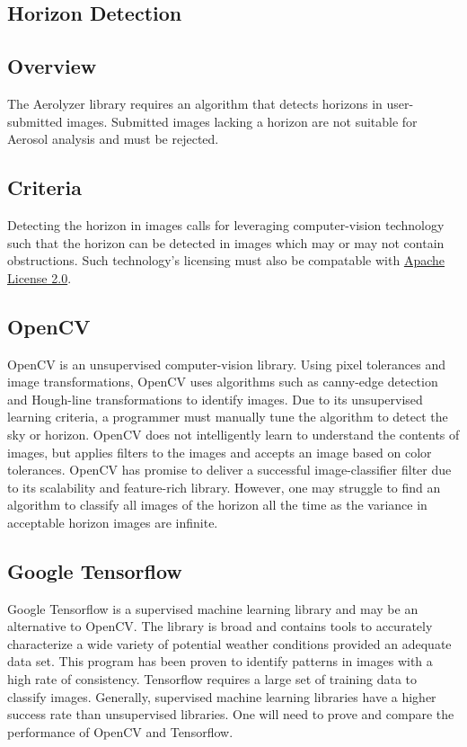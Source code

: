 \documentclass[journal,10pt,draftclsnofoot,onecolumn]{IEEEtran}
\begin{document}
\begin{singlespace}

\section{Horizon Detection}
	\subsection{Overview}
	The Aerolyzer library requires an algorithm that detects horizons in user-submitted images.
	Submitted images lacking a horizon are not suitable for Aerosol analysis and must be rejected.

	\subsection{Criteria}
	Detecting the horizon in images calls for leveraging computer-vision technology such that the horizon can be detected in images which may or may not contain obstructions.
	Such technology's licensing must also be compatable with \href{https://www.apache.org/licenses/LICENSE-2.0}{Apache License 2.0}.

	\subsection{OpenCV}
	OpenCV is an unsupervised computer-vision library.
	Using pixel tolerances and image transformations, OpenCV uses algorithms such as canny-edge detection and Hough-line transformations to identify images.
	Due to its unsupervised learning criteria, a programmer must manually tune the algorithm to detect the sky or horizon.
	OpenCV does not intelligently learn to understand the contents of images, but applies filters to the images and accepts an image based on color tolerances.
	OpenCV has promise to deliver a successful image-classifier filter due to its scalability and feature-rich library.
	However, one may struggle to find an algorithm to classify all images of the horizon all the time as the variance in acceptable horizon images are infinite.

	\subsection{Google Tensorflow}
	Google Tensorflow is a supervised machine learning library and may be an alternative to OpenCV.
	The library is broad and contains tools to accurately characterize a wide variety of potential weather conditions provided an adequate data set.
	This program has been proven to identify patterns in images with a high rate of consistency.
	Tensorflow requires a large set of training data to classify images.
	Generally, supervised machine learning libraries have a higher success rate than unsupervised libraries.
	One will need to prove and compare the performance of OpenCV and Tensorflow.


\end{singlespace}
\end{document}
